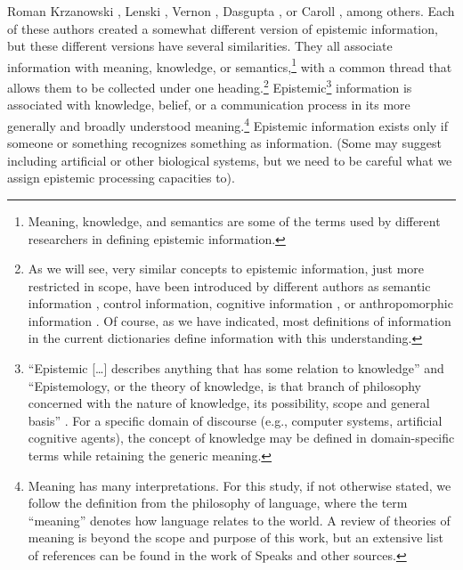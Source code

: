\begin{artengenv}{Roman Krzanowski}
\parencite*[][]{burgin_information_2003}, %
 Lenski 
\parencite*[][]{lenski_information_2010}, %
 Vernon 
\parencite*[][]{vernon_artificial_2014}, %
 Dasgupta 
\parencite*[][]{dasgupta_computer_2016}, %
 or Caroll 
\parencite*[][]{carroll_big_2017}, %
 among others. Each of these authors created a somewhat different version of epistemic information, but these different versions have several similarities. They all associate information with meaning, knowledge, or semantics,\footnote{Meaning, knowledge, and semantics are some of the terms used by different researchers in defining epistemic information.} with a common thread that allows them to be collected under one heading.\footnote{As we will see, very similar concepts to epistemic information, just more restricted in scope, have been introduced by different authors as semantic information 
\parencites[e.g.][]{bar-hillel_semantic_1953}[][]{dretske_knowledge_1999}, %
 control information, cognitive information 
\parencite[][]{hanson_intrinsic_1990}, %
 or anthropomorphic information 
\parencite[][]{heller_na_2005}. %
 Of course, as we have indicated, most definitions of information in the current dictionaries define information with this understanding.} Epistemic\footnote{``Epistemic […] describes anything that has some relation to knowledge'' and ``Epistemology, or the theory of knowledge, is that branch of philosophy concerned with the nature of knowledge, its possibility, scope and general basis'' 
\parencite[][]{honderich_oxford_1995}. %
 For a specific domain of discourse (e.g., computer systems, artificial cognitive agents), the concept of knowledge may be defined in domain-specific terms while retaining the generic meaning.} information is associated with knowledge, belief, or a communication process in its more generally and broadly understood meaning.\footnote{Meaning has many interpretations. For this study, if not otherwise stated, we follow the definition from the philosophy of language, where the term ``meaning'' denotes how language relates to the world. A review of theories of meaning is beyond the scope and purpose of this work, but an extensive list of references can be found in the work of Speaks 
\parencite*[][]{speaks_theories_2018} %
 and other sources. } Epistemic information exists only if someone or something recognizes something as information. (Some may suggest including artificial or other biological systems, but we need to be careful what we assign epistemic processing capacities to).


\end{artengenv}
